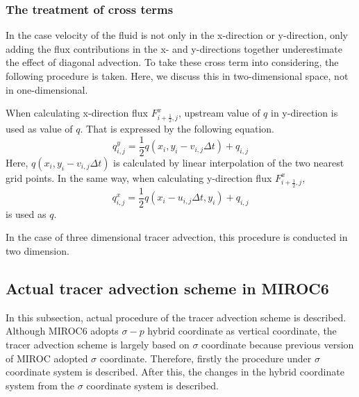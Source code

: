 \documentclass{article}
\begin{document}
\subsubsection{The treatment of cross terms}
In the case velocity of the fluid is not only in the x-direction or y-direction, only adding the flux contributions in the x- and y-directions together underestimate the effect of diagonal advection. 
To take these cross term into considering, the following procedure is taken.
Here, we discuss this in two-dimensional space, not in one-dimensional.

When calculating x-direction flux $F^{x}_{i+\frac{1}{2},j}$, upstream value of $q$ in y-direction is used as value of $q$.
That is expressed by the following equation.
  \begin{equation}
    q^{y}_{i,j}=\frac{1}{2} {q(x_{i},y_{i}-v_{i,j}\Delta t)+q_{i,j}}
  \end{equation}
Here, $q(x_{i},y_{i}-v_{i,j}\Delta t)$ is calculated by linear interpolation of the two nearest grid points.
In the same way, when calculating y-direction flux $F^{x}_{i+\frac{1}{2},j}$,
  \begin{equation}
    q^{x}_{i,j}=\frac{1}{2} {q(x_{i}-u_{i,j}\Delta t,y_{i})+q_{i,j}}
  \end{equation}
  is used as $q$.

  In the case of three dimensional tracer advection, this procedure is conducted in two dimension.
  
  \subsection{Actual tracer advection scheme in MIROC6}
  In this subsection, actual procedure of the tracer advection scheme is described.
  Although MIROC6 adopts $\sigma -p$ hybrid coordinate as vertical coordinate, the tracer advection scheme is largely based on $\sigma$ coordinate because previous version of MIROC adopted $\sigma$ coordinate. 
  Therefore, firstly the procedure under $\sigma$ coordinate system is described.
  After this, the changes in the hybrid coordinate system from the $\sigma$ coordinate system is described.
\end{document}
